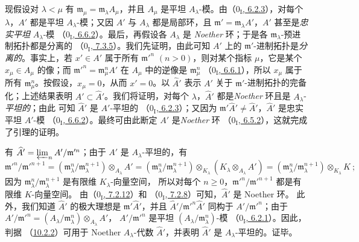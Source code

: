\documentclass[UTF8,fontset=none,11pt,oneside,openany]{ctexbook}
\newcommand{\oldpage}[2][]{%
  \hypertarget{ega-source-page-#1-#2}{}%
  \marginnote{\scriptsize\textbf{#1}~|~#2}\ignorespaces}
\begin{document}
现假设对 $\lambda<\mu$ 有 $\mathfrak m_\mu=\mathfrak m_\lambda A_\mu$，并且 $A_\mu$
是平坦 $A_\lambda$-模。由（\hyperref[0.6.2.3-fr]{$0_{\mathrm I}$, 6.2.3}），对每个
$\lambda$，$A'$ 都是平坦 $A_\lambda$-模；又因 $A'$ 与 $A_\lambda$ 都是局部环，且
$\mathfrak m'=\mathfrak m_\lambda A'$，$A'$ 甚至是\emph{忠实平坦} $A_\lambda$-模
（\hyperref[0.6.6.2-fr]{$0_{\mathrm I}$, 6.6.2}）。最后，再假设各 $A_\lambda$ 是
\emph{Noether} 环；于是各 $\mathfrak m_\lambda$-预进制拓扑都是分离的
（\hyperref[0.7.3.5-fr]{$0_{\mathrm I}$, 7.3.5}）。我们先证明，由此可知 $A'$ 上的
$\mathfrak m'$-进制拓扑是\emph{分离的}。事实上，若 $x'\in A'$ 属于所有
$\mathfrak m'^{n}$ $(n>0)$，则对某个指标 $\mu$，它是某个 $x_\mu\in A_\mu$ 的像；而
$\mathfrak m'^{n}=\mathfrak m_\mu^n A'$ 在 $A_\mu$ 中的逆像是 $\mathfrak m_\mu^n$
（\hyperref[0.6.6.1-fr]{$0_{\mathrm I}$, 6.6.1}），所以 $x_\mu$ 属于所有
$\mathfrak m_\mu^n$。按假设，$x_\mu=0$，从而 $x'=0$。以 $\widehat A'$ 表示 $A'$ 关于
$\mathfrak m'$-进制拓扑的完备化；上述结果表明 $A'\subset\widehat A'$。我们将证明，对每个
$\lambda$，$\widehat A'$ 都是\emph{Noether} 环且是 $A_\lambda$-\emph{平坦的}；由此
\oldpage[0\textsubscript{III}]{22}
可知 $\widehat A'$ 是 $A'$-平坦的
（\hyperref[0.6.2.3-fr]{$0_{\mathrm I}$, 6.2.3}）；又因为
$\mathfrak m'\widehat A'\ne\widehat A'$，$\widehat A'$ 是忠实平坦 $A'$-模
（\hyperref[0.6.6.2-fr]{$0_{\mathrm I}$, 6.6.2}）。最终可由此断定 $A'$ 是\emph{Noether} 环
（\hyperref[0.6.5.2-fr]{$0_{\mathrm I}$, 6.5.2}），这就完成了引理的证明。

有 $\widehat A'=\varprojlim_n A'/\mathfrak m'^{n}$；由于 $A'$ 是 $A_\lambda$-平坦的，有
\[
  \mathfrak m'^{n}/\mathfrak m'^{n+1}
  =(\mathfrak m_\lambda^n/\mathfrak m_\lambda^{n+1})
    \otimes_{A_\lambda}A'
  =(\mathfrak m_\lambda^n/\mathfrak m_\lambda^{n+1})
    \otimes_{K_\lambda}(K_\lambda\otimes_{A_\lambda}A')
  =(\mathfrak m_\lambda^n/\mathfrak m_\lambda^{n+1})
    \otimes_{K_\lambda}K~;
\]
因为 $\mathfrak m_\lambda^n/\mathfrak m_\lambda^{n+1}$ 是有限维 $K_\lambda$-向量空间，
所以对每个 $n\geq0$，$\mathfrak m'^{n}/\mathfrak m'^{n+1}$ 都是有限维 $K$-向量空间。
由（\hyperref[0.7.2.12-fr]{$0_{\mathrm I}$, 7.2.12}）和
（\hyperref[0.7.2.8-fr]{$0_{\mathrm I}$, 7.2.8}）可知，$\widehat A'$ 是 Noether 环。
此外，我们知道 $\widehat A'$ 的极大理想是 $\mathfrak m'\widehat A'$，并且
$\widehat A'/\mathfrak m'^{n}\widehat A'$ 同构于 $A'/\mathfrak m'^{n}$；由于
$A'/\mathfrak m'^{n}=(A_\lambda/\mathfrak m_\lambda^n) \otimes_{A_\lambda}A'$，
$A'/\mathfrak m'^{n}$ 是平坦 $(A_\lambda/\mathfrak m_\lambda^n)$-模
（\hyperref[0.6.2.1-fr]{$0_{\mathrm I}$, 6.2.1}）。因此，判据
（\hyperref[0.10.2.2-fr]{10.2.2}）可用于 Noether $A_\lambda$-代数 $\widehat A'$，并表明
$\widehat A'$ 是 $A_\lambda$-平坦的。证毕。
\end{document}
